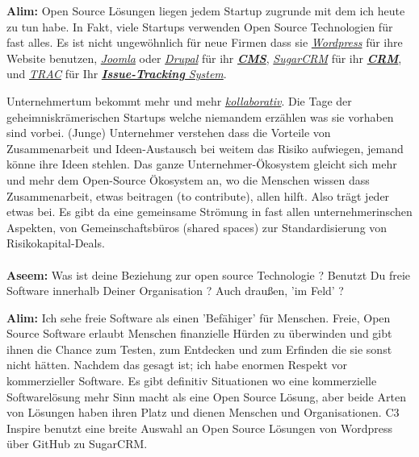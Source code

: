 \textbf{Alim:} Open Source Lösungen liegen jedem Startup zugrunde mit dem ich 
heute zu tun habe. In Fakt, viele Startups verwenden Open Source 
Technologien für fast alles. Es ist nicht ungewöhnlich für neue 
Firmen dass sie \href{http://wordpress.org/}{\textit{Wordpress}} für ihre Website 
benutzen, \href{http://www.joomla.de/}{\textit{Joomla}} oder \href{https://drupal.org/}{\textit{Drupal}} für ihr 
\href{https://de.wikipedia.org/wiki/Content-Management-System}{\textit{\textbf{CMS}}}, 
\href{https://de.wikipedia.org/wiki/SugarCRM}{\textit{SugarCRM}} für ihr 
\href{https://de.wikipedia.org/wiki/Customer-Relationship-Management}{\textit{\textbf{CRM}}}, und \href{https://de.wikipedia.org/wiki/Trac}{\textit{TRAC}} für Ihr 
\href{https://de.wikipedia.org/wiki/Issue-Tracking-System}{\textit{\textbf{Issue-Tracking} 
System}}.

Unternehmertum bekommt mehr und mehr \href{https://de.wikipedia.org/wiki/Kollaboration}{\textit{kollaborativ}}. Die Tage der 
geheimniskrämerischen Startups welche niemandem erzählen was sie 
vorhaben sind vorbei. (Junge) Unternehmer verstehen dass die Vorteile von 
Zusammenarbeit und Ideen-Austausch bei weitem das Risiko aufwiegen, 
jemand könne ihre Ideen stehlen. Das ganze Unternehmer-Ökosystem 
gleicht sich mehr und mehr dem Open-Source Ökosystem an, wo die 
Menschen wissen dass Zusammenarbeit, etwas beitragen (to contribute),  
allen hilft. Also trägt jeder etwas bei. Es gibt da eine gemeinsame 
Strömung in fast allen unternehmerinschen Aspekten, von 
Gemeinschaftsbüros (shared spaces) zur Standardisierung von 
Risikokapital-Deals.


\paragraph{}
\textbf{Aseem:} Was ist deine Beziehung zur open source Technologie ? Benutzt 
Du freie Software innerhalb Deiner Organisation ? Auch draußen, 'im 
Feld' ?

\textbf{Alim:} Ich sehe freie Software als einen 'Befähiger' für Menschen. 
Freie, Open Source Software erlaubt Menschen finanzielle Hürden zu 
überwinden und gibt ihnen die Chance zum Testen, zum Entdecken und 
zum Erfinden die sie sonst nicht hätten. Nachdem das gesagt ist; ich 
habe enormen Respekt vor kommerzieller Software. Es gibt definitiv 
Situationen wo eine kommerzielle Softwarelösung mehr Sinn macht als 
eine Open Source Lösung, aber beide Arten von Lösungen haben ihren 
Platz und dienen Menschen und Organisationen. C3 Inspire benutzt eine 
breite Auswahl an Open Source Lösungen von Wordpress über GitHub zu 
SugarCRM.

